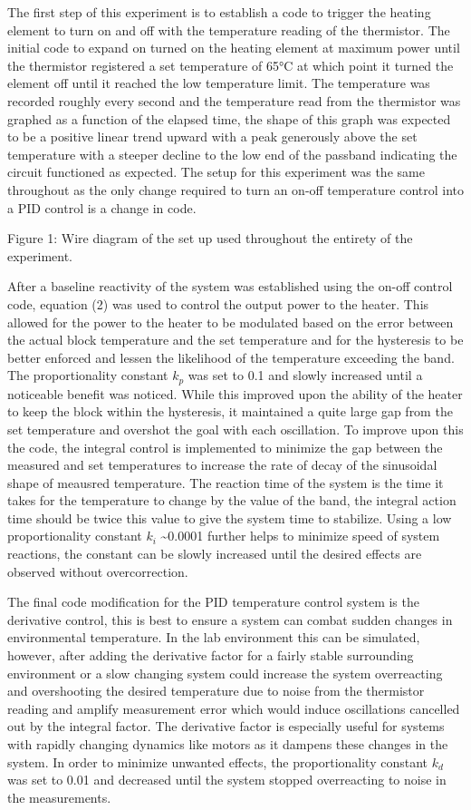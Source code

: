 \documentclass[11pt]{article}
\begin{document}
    The first step of this experiment is to establish a code to trigger the
heating element to turn on and off with the temperature reading of the
thermistor. The initial code to expand on turned on the heating element
at maximum power until the thermistor registered a set temperature of
65°C at which point it turned the element off until it reached the low
temperature limit. The temperature was recorded roughly every second and
the temperature read from the thermistor was graphed as a function of
the elapsed time, the shape of this graph was expected to be a positive
linear trend upward with a peak generously above the set temperature
with a steeper decline to the low end of the passband indicating the
circuit functioned as expected. The setup for this experiment was the
same throughout as the only change required to turn an on-off
temperature control into a PID control is a change in code.

    Figure 1: Wire diagram of the set up used throughout the entirety of the
experiment.

    After a baseline reactivity of the system was established using the
on-off control code, equation (2) was used to control the output power
to the heater. This allowed for the power to the heater to be modulated
based on the error between the actual block temperature and the set
temperature and for the hysteresis to be better enforced and lessen the
likelihood of the temperature exceeding the band. The proportionality
constant \(k_p\) was set to 0.1 and slowly increased until a noticeable
benefit was noticed. While this improved upon the ability of the heater
to keep the block within the hysteresis, it maintained a quite large gap
from the set temperature and overshot the goal with each oscillation. To
improve upon this the code, the integral control is implemented to
minimize the gap between the measured and set temperatures to increase
the rate of decay of the sinusoidal shape of meausred temperature. The
reaction time of the system is the time it takes for the temperature to
change by the value of the band, the integral action time should be
twice this value to give the system time to stabilize. Using a low
proportionality constant \(k_i\) \textasciitilde0.0001 further helps to
minimize speed of system reactions, the constant can be slowly increased
until the desired effects are observed without overcorrection.

The final code modification for the PID temperature control system is
the derivative control, this is best to ensure a system can combat
sudden changes in environmental temperature. In the lab environment this
can be simulated, however, after adding the derivative factor for a
fairly stable surrounding environment or a slow changing system could
increase the system overreacting and overshooting the desired
temperature due to noise from the thermistor reading and amplify
measurement error which would induce oscillations cancelled out by the
integral factor. The derivative factor is especially useful for systems
with rapidly changing dynamics like motors as it dampens these changes
in the system. In order to minimize unwanted effects, the
proportionality constant \(k_d\) was set to 0.01 and decreased until the
system stopped overreacting to noise in the measurements.
\end{document}
